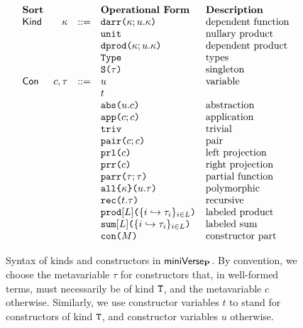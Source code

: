 \begin{figure}[p] 
\[\begin{array}{lrlllll}
\textbf{Sort} & & & \textbf{Operational Form} 
& \textbf{Description}\\
\mathsf{Kind} & \kappa & ::= & \texttt{darr}\texttt{(}\kappa; u.\kappa\texttt{)} 
& \text{dependent function}\\
&&& \texttt{unit} 
& \text{nullary product}\\
&&& \texttt{dprod}\texttt{(}\kappa; u.\kappa\texttt{)} 
& \text{dependent product}\\
&&& \texttt{Type} 
& \text{types}\\
&&& \texttt{S}\texttt{(}\tau\texttt{)} 
& \text{singleton}\\
\mathsf{Con} & c, \tau & ::= & u 
& \text{variable}\\
&&& t 
\\
&&& \texttt{abs}\texttt{(}u.c\texttt{)} 
& \text{abstraction}\\
&&& \texttt{app}\texttt{(}c; c\texttt{)} 
& \text{application}\\
&&& \texttt{triv} 
& \text{trivial}\\
&&& \texttt{pair}\texttt{(}c; c\texttt{)}
& \text{pair}\\
&&& \texttt{prl}\texttt{(}c\texttt{)} 
& \text{left projection}\\
&&& \texttt{prr}\texttt{(}c\texttt{)} 
& \text{right projection}\\
&&& \texttt{parr}\texttt{(}\tau; \tau\texttt{)} 
& \text{partial function}\\
&&& \texttt{all}\texttt{\{}\kappa\texttt{\}(}u.\tau\texttt{)} 
& \text{polymorphic}\\
&&& \texttt{rec}\texttt{(}t.\tau\texttt{)} 
& \text{recursive}\\
&&& \texttt{prod}[L]\texttt{(}\{i \hookrightarrow \tau_{i}\}_{i \in L}\texttt{)} 
& \text{labeled product}\\
&&& \texttt{sum}[L]\texttt{(}\{i \hookrightarrow \tau_{i}\}_{i \in L}\texttt{)} 
& \text{labeled sum}\\
&&& \texttt{con}\texttt{(}M\texttt{)} 
& \text{constructor part}
\end{array}\]
\caption[Syntax of kinds and constructors in $\miniVerseParam$]{Syntax of kinds and constructors in $\miniVerseParam$. By convention, we choose the metavariable $\tau$ for constructors that, in well-formed terms, must necessarily be of kind $\texttt{T}$, and the metavariable $c$ otherwise. Similarly, we use constructor variables $t$ to stand for constructors of kind $\texttt{T}$, and constructor variables $u$ otherwise.}
\label{fig:P-kinds-constructors}
\end{figure}

